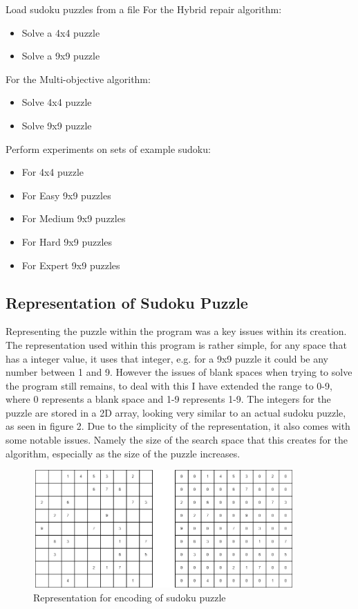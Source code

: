 \documentclass[a4paper,11pt]{article}
\begin{document}
Load sudoku puzzles from a file\newline
For the Hybrid repair algorithm:
\begin{itemize}
	\item Solve a 4x4 puzzle  
	\item Solve a 9x9 puzzle
\end{itemize}
For the Multi-objective algorithm:
\begin{itemize}
	\item Solve 4x4 puzzle
	\item Solve 9x9 puzzle
\end{itemize}
Perform experiments on sets of example sudoku:
\begin{itemize}
	\item For 4x4 puzzle
	\item For Easy 9x9 puzzles
	\item For Medium 9x9 puzzles
	\item For Hard 9x9 puzzles
	\item For Expert 9x9 puzzles
\end{itemize}



\subsection{Representation of Sudoku Puzzle}
Representing the puzzle within the program was a key issues within its creation. The representation used within this program is rather simple, for any space that has a integer value, it uses that integer, e.g. for a 9x9 puzzle it could be any number between 1 and 9. However the issues of blank spaces when trying to solve the program still remains, to deal with this I have extended the range to 0-9, where 0 represents a blank space and 1-9 represents 1-9. The integers for the puzzle are stored in a 2D array, looking very similar to an actual sudoku puzzle, as seen in figure 2. Due to the simplicity of the representation, it also comes with some notable issues. Namely the size of the search space that this creates for the algorithm, especially as the size of the puzzle increases. 
\begin{figure}[h]
	\caption{Representation for encoding of sudoku puzzle}
	\centering
	\includegraphics[height=4.5cm, width=10cm]{./Diagrams/representationDiagram}
\end{figure}
\end{document}
